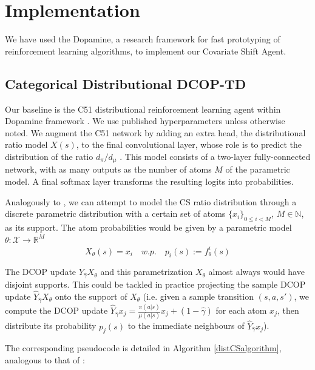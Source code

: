 \documentclass[12pt,a4paper,openright,twoside]{article}
\numberwithin{equation}{section}
\theoremstyle{definition}
\theoremstyle{remark}
\theoremstyle{plain}
\begin{document}
\newpage

\thispagestyle{plain}
\section{Implementation}

We have used the Dopamine\cite{dopamine}, a research framework for fast prototyping of reinforcement learning algorithms, to implement our Covariate Shift Agent.

\subsection{Categorical Distributional DCOP-TD}

Our baseline is the C51 distributional reinforcement learning agent\cite{DRL} within Dopamine framework \cite{dopamine}. We use published hyperparameters unless otherwise noted. We augment the C51 network by adding an extra head, the distributional ratio model $X(s)$, to the final convolutional layer, whose role is to predict the distribution of the ratio $d_\pi / d_\mu$ . This model consists of a two-layer fully-connected network, with as many outputs as the number of atoms $M$ of the parametric model. A final softmax layer transforms the resulting logits into probabilities. 

Analogously to \cite{DRL}, we can attempt to model the CS ratio distribution through a discrete parametric distribution with a certain set of atoms $\{x_i\}_{0 \leq i<M}$, $M \in \mathbb{N}$, as its support. The atom probabilities would be given by a parametric model $\theta : \mathcal{X} \rightarrow \mathbb{R}^M$
\begin{equation}
    X_{\theta} (s) = x_i \quad w.p. \quad p_i(s) := f_{\theta}^i(s)
\end{equation}

The DCOP update $Y_{\hat{\gamma}}X_\theta$ and this parametrization $X_\theta$ almost always would have disjoint supports. This could be tackled in practice projecting the sample DCOP update $\hat{Y}_{\hat{\gamma}}X_\theta$ onto the support of $X_\theta$ (i.e. given a sample transition $(s,a,s')$, we compute the DCOP update $\hat{Y}_{\hat{\gamma}}x_j =  \frac{\pi(a|s)}{\mu(a|s)}x_j + (1-\hat{\gamma})$ for each atom $x_j$, then distribute its probability $p_j(s)$ to the immediate neighbours of $\hat{Y}_{\hat{\gamma}}x_j$).

The corresponding pseudocode is detailed in Algorithm \ref{distCSalgorithm}, analogous to that of \cite{DRL}:
\end{document}

